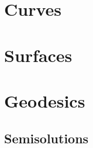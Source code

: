 \documentclass[twoside]{book}
\begin{document}







\part{Curves}






\part{Surfaces}


   



\part{Geodesics}







\appendix

\chapter{Semisolutions}



{

\small\sloppy


}

{

\sloppy
\printbibliography[heading=bibintoc]
\fussy

}
\end{document}
